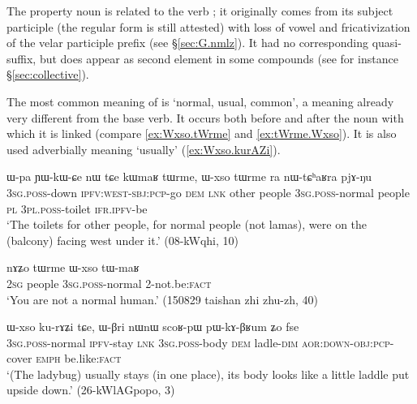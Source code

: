 The property noun  is related to the verb ; it originally comes from its subject participle (the regular form  is still attested) with loss of vowel and fricativization of the velar participle prefix (see §\ref{sec:G.nmlz}). It had no corresponding quasi-suffix, but does appear as second element in some compounds  (see for instance §\ref{sec:collective}).

The most common meaning of  is `normal, usual, common', a meaning already very different from the base verb. It occurs both before and after the noun with which it is linked (compare \ref{ex:Wxso.tWrme} and \ref{ex:tWrme.Wxso}). It is also used adverbially meaning `usually' (\ref{ex:Wxso.kurAZi}).

\begin{exe}
\ex \label{ex:Wxso.tWrme}
\gll ɯ-pa ɲɯ-kɯ-ɕe nɯ tɕe kɯmaʁ tɯrme, ɯ-xso tɯrme ra nɯ-tɕʰaʁra pjɤ-ŋu \\
\textsc{3sg}.\textsc{poss}-down \textsc{ipfv}:\textsc{west}-\textsc{sbj}:\textsc{pcp}-go \textsc{dem} \textsc{lnk} other people \textsc{3sg}.\textsc{poss}-normal people \textsc{pl} \textsc{3pl}.\textsc{poss}-toilet \textsc{ifr}.\textsc{ipfv}-be \\
\glt `The toilets for other people, for normal people (not lamas), were on the (balcony) facing west under it.' (08-kWqhi, 10)
\end{exe} 

\begin{exe}
\ex \label{ex:tWrme.Wxso}
\gll   nɤʑo tɯrme ɯ-xso tɯ-maʁ \\
\textsc{2sg} people  \textsc{3sg}.\textsc{poss}-normal  2-not.be:\textsc{fact} \\
\glt `You are not a normal human.' (150829 taishan zhi zhu-zh, 40)
\end{exe} 

\begin{exe}
\ex \label{ex:Wxso.kurAZi}
\gll  ɯ-xso ku-rɤʑi tɕe,  ɯ-βri nɯnɯ scoʁ-pɯ pɯ-kɤ-βʁum ʑo fse  \\
\textsc{3sg}.\textsc{poss}-normal \textsc{ipfv}-stay \textsc{lnk} \textsc{3sg}.\textsc{poss}-body \textsc{dem} ladle-\textsc{dim} \textsc{aor}:\textsc{down}-\textsc{obj}:\textsc{pcp}-cover \textsc{emph} be.like:\textsc{fact} \\
\glt `(The ladybug) usually stays (in one place), its body looks like a little laddle put upside down.' (26-kWlAGpopo, 3)
\end{exe} 

